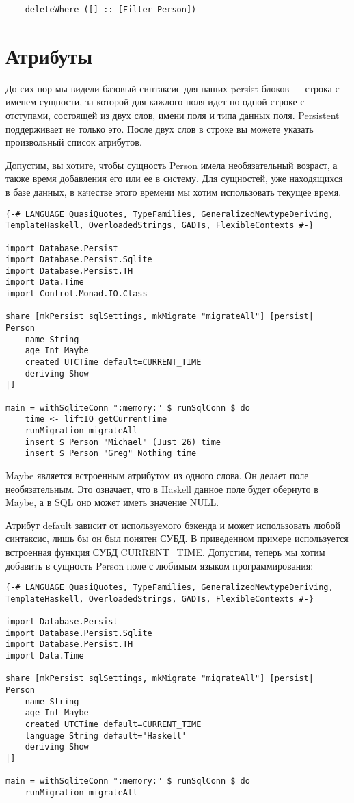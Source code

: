 \begin{lstlisting}
    deleteWhere ([] :: [Filter Person])
\end{lstlisting}

\section{Атрибуты} %

До сих пор мы видели базовый синтаксис для наших persist-блоков --- строка с именем сущности, за которой для кажлого поля идет по одной строке с отступами, состоящей из двух слов, имени поля и типа данных поля. Persistent поддерживает не только это. После двух слов в строке вы можете указать произвольный список атрибутов.

Допустим, вы хотите, чтобы сущность Person имела необязательный возраст, а также время добавления его или ее в систему. Для сущностей, уже находящихся в базе данных, в качестве этого времени мы хотим использовать текущее время.

\begin{lstlisting}
{-# LANGUAGE QuasiQuotes, TypeFamilies, GeneralizedNewtypeDeriving, TemplateHaskell, OverloadedStrings, GADTs, FlexibleContexts #-}

import Database.Persist
import Database.Persist.Sqlite
import Database.Persist.TH
import Data.Time
import Control.Monad.IO.Class

share [mkPersist sqlSettings, mkMigrate "migrateAll"] [persist|
Person
    name String
    age Int Maybe
    created UTCTime default=CURRENT_TIME
    deriving Show
|]

main = withSqliteConn ":memory:" $ runSqlConn $ do
    time <- liftIO getCurrentTime
    runMigration migrateAll
    insert $ Person "Michael" (Just 26) time
    insert $ Person "Greg" Nothing time
\end{lstlisting}%

Maybe является встроенным атрибутом из одного слова. Он делает поле необязательным. Это означает, что в Haskell данное поле будет обернуто в Maybe, а в SQL оно может иметь значение NULL.

Атрибут default зависит от используемого бэкенда и может использовать любой синтаксис, лишь бы он был понятен СУБД. В приведенном примере используется встроенная функция СУБД CURRENT_TIME. Допустим, теперь мы хотим добавить в сущность Person поле с любимым языком программирования:

\begin{lstlisting}
{-# LANGUAGE QuasiQuotes, TypeFamilies, GeneralizedNewtypeDeriving, TemplateHaskell, OverloadedStrings, GADTs, FlexibleContexts #-}

import Database.Persist
import Database.Persist.Sqlite
import Database.Persist.TH
import Data.Time

share [mkPersist sqlSettings, mkMigrate "migrateAll"] [persist|
Person
    name String
    age Int Maybe
    created UTCTime default=CURRENT_TIME
    language String default='Haskell'
    deriving Show
|]

main = withSqliteConn ":memory:" $ runSqlConn $ do
    runMigration migrateAll
\end{lstlisting}%

